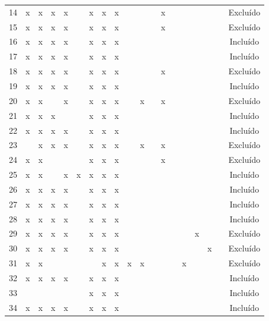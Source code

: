 \documentclass[
	12pt,				%
	oneside,			%
	a4paper,			%
	english,			%
	brazil				%
	]{abntex2ppgsi}
\begin{document}
\begin{apendicesenv}
\begin{table}[H]
\begin{tabular}{c | c c c c c c c c | c c c c c c c c c | c}
14 & x & x & x & x &   & x & x & x &   &   &   & x &   &   &   &   &   & Excluído \\
15 & x & x & x & x &   & x & x & x &   &   &   & x &   &   &   &   &   & Excluído \\
16 & x & x & x & x &   & x & x & x &   &   &   &   &   &   &   &   &   & Incluído \\
17 & x & x & x & x &   & x & x & x &   &   &   &   &   &   &   &   &   & Incluído \\
18 & x & x & x & x &   & x & x & x &   &   &   & x &   &   &   &   &   & Excluído \\
19 & x & x & x & x &   & x & x & x &   &   &   &   &   &   &   &   &   & Incluído \\
20 & x & x &   & x &   & x & x & x &   & x &   & x &   &   &   &   &   & Excluído \\
21 & x & x & x &   &   & x & x & x &   &   &   &   &   &   &   &   &   & Incluído \\
22 & x & x & x & x &   & x & x & x &   &   &   &   &   &   &   &   &   & Incluído \\
23 &   & x & x & x &   & x & x & x &   & x &   & x &   &   &   &   &   & Excluído \\
24 & x & x &   &   &   & x & x & x &   &   &   & x &   &   &   &   &   & Excluído \\
25 & x & x &   & x & x & x & x & x &   &   &   &   &   &   &   &   &   & Incluído \\
26 & x & x & x & x &   & x & x & x &   &   &   &   &   &   &   &   &   & Incluído \\
27 & x & x & x & x &   & x & x & x &   &   &   &   &   &   &   &   &   & Incluído \\
28 & x & x & x & x &   & x & x & x &   &   &   &   &   &   &   &   &   & Incluído \\
29 & x & x & x & x &   & x & x & x &   &   &   &   &   &   & x &   &   & Excluído \\
30 & x & x & x & x &   & x & x & x &   &   &   &   &   &   &   & x &   & Excluído \\
31 & x & x &   &   &   &   & x & x & x & x &   &   &   & x &   &   &   & Excluído \\
32 & x & x & x & x &   & x & x & x &   &   &   &   &   &   &   &   &   & Incluído \\
33 &   &   &   &   &   & x & x & x &   &   &   &   &   &   &   &   &   & Incluído \\
34 & x & x & x & x &   & x & x & x &   &   &   &   &   &   &   &   &   & Incluído \\

\end{tabular}
\end{table}
\end{apendicesenv}
\end{document}
